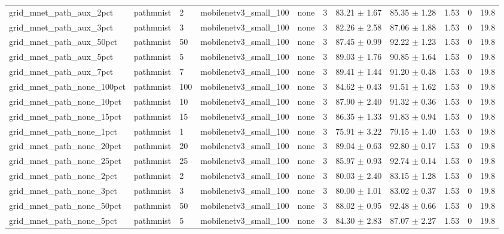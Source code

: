 \begin{tabular}{lllllllllll}
grid_mnet_path_aux_2pct & pathmnist & 2 & mobilenetv3_small_100 & none & 3 & 83.21 $\pm$ 1.67 & 85.35 $\pm$ 1.28 & 1.53 & 0 & 19.8 \\
grid_mnet_path_aux_3pct & pathmnist & 3 & mobilenetv3_small_100 & none & 3 & 82.26 $\pm$ 2.58 & 87.06 $\pm$ 1.88 & 1.53 & 0 & 19.8 \\
grid_mnet_path_aux_50pct & pathmnist & 50 & mobilenetv3_small_100 & none & 3 & 87.45 $\pm$ 0.99 & 92.22 $\pm$ 1.23 & 1.53 & 0 & 19.8 \\
grid_mnet_path_aux_5pct & pathmnist & 5 & mobilenetv3_small_100 & none & 3 & 89.03 $\pm$ 1.76 & 90.85 $\pm$ 1.64 & 1.53 & 0 & 19.8 \\
grid_mnet_path_aux_7pct & pathmnist & 7 & mobilenetv3_small_100 & none & 3 & 89.41 $\pm$ 1.44 & 91.20 $\pm$ 0.48 & 1.53 & 0 & 19.8 \\
grid_mnet_path_none_100pct & pathmnist & 100 & mobilenetv3_small_100 & none & 3 & 84.62 $\pm$ 0.43 & 91.51 $\pm$ 1.62 & 1.53 & 0 & 19.8 \\
grid_mnet_path_none_10pct & pathmnist & 10 & mobilenetv3_small_100 & none & 3 & 87.90 $\pm$ 2.40 & 91.32 $\pm$ 0.36 & 1.53 & 0 & 19.8 \\
grid_mnet_path_none_15pct & pathmnist & 15 & mobilenetv3_small_100 & none & 3 & 86.35 $\pm$ 1.33 & 91.83 $\pm$ 0.94 & 1.53 & 0 & 19.8 \\
grid_mnet_path_none_1pct & pathmnist & 1 & mobilenetv3_small_100 & none & 3 & 75.91 $\pm$ 3.22 & 79.15 $\pm$ 1.40 & 1.53 & 0 & 19.8 \\
grid_mnet_path_none_20pct & pathmnist & 20 & mobilenetv3_small_100 & none & 3 & 89.04 $\pm$ 0.63 & 92.80 $\pm$ 0.17 & 1.53 & 0 & 19.8 \\
grid_mnet_path_none_25pct & pathmnist & 25 & mobilenetv3_small_100 & none & 3 & 85.97 $\pm$ 0.93 & 92.74 $\pm$ 0.14 & 1.53 & 0 & 19.8 \\
grid_mnet_path_none_2pct & pathmnist & 2 & mobilenetv3_small_100 & none & 3 & 80.03 $\pm$ 2.40 & 83.15 $\pm$ 1.28 & 1.53 & 0 & 19.8 \\
grid_mnet_path_none_3pct & pathmnist & 3 & mobilenetv3_small_100 & none & 3 & 80.00 $\pm$ 1.01 & 83.02 $\pm$ 0.37 & 1.53 & 0 & 19.8 \\
grid_mnet_path_none_50pct & pathmnist & 50 & mobilenetv3_small_100 & none & 3 & 88.02 $\pm$ 0.95 & 92.48 $\pm$ 0.66 & 1.53 & 0 & 19.8 \\
grid_mnet_path_none_5pct & pathmnist & 5 & mobilenetv3_small_100 & none & 3 & 84.30 $\pm$ 2.83 & 87.07 $\pm$ 2.27 & 1.53 & 0 & 19.8 \\

\end{tabular}
